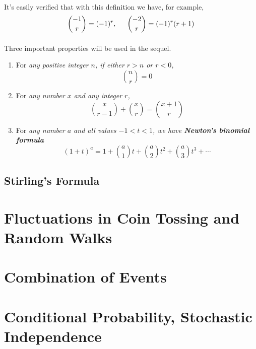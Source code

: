 \documentclass{article}
\numberwithin{equation}{subsection}
\begin{document}
			\paragraph{} It's easily verified that with this definition we have, for example,
			\begin{equation}
				{-1\choose r} = (-1)^r, \indent {-2\choose r} = (-1)^r(r+1)
			\end{equation}
			\paragraph{} Three important properties will be used in the sequel.
			\begin{enumerate}
			\item For \textit{any positive integer $n$, if either $r>n$ or $r<0$,} 
			\begin{equation}
				{n \choose r} = 0
			\end{equation}
			\item For \textit{any number $x$ and any integer $r$,}
			\begin{equation}
				{x \choose r-1}+{x \choose r} = {x+1 \choose r}
			\end{equation}
			\item For \textit{any number $a$ and all values $-1<t<1$, we have \textbf{Newton's binomial formula}}
			\begin{equation}
				(1+t)^a = 1+{a\choose 1}t+{a\choose 2}t^2+{a\choose 3}t^3+\cdots
			\end{equation}
			\end{enumerate}
		\subsection{Stirling's Formula}
	\newpage
	\section{Fluctuations in Coin Tossing and Random Walks}
			
	\newpage
	\section{Combination of Events}
					
	\newpage
	\section{Conditional Probability, Stochastic Independence}
			
		
\end{document}
